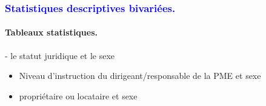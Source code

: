 \documentclass[
]{article}
\begin{document}
\hfill\break

\textcolor{blue}{\subsubsection{ Statistiques descriptives bivariées.}}

\hfill\break

\hypertarget{tableaux-statistiques.-1}{%
\paragraph{Tableaux statistiques.}\label{tableaux-statistiques.-1}}

\hfill\break
- le statut juridique et le sexe

\begin{itemize}
\item
  Niveau d'instruction du dirigeant/responsable de la PME et sexe
\item
  propriétaire ou locataire et sexe
\end{itemize}

\hfill\break
\end{document}
